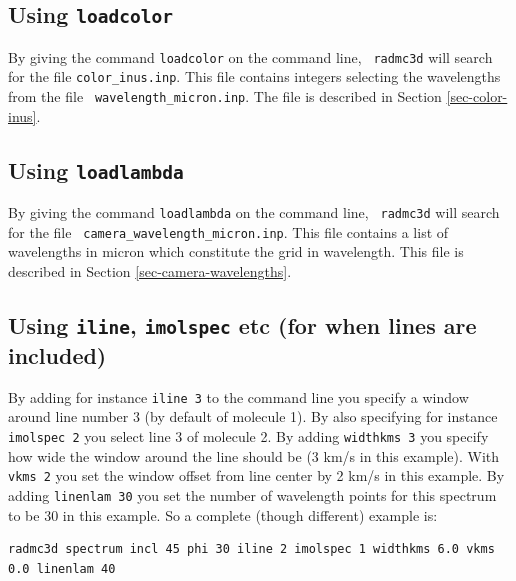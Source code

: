 \documentclass{report}
\newenvironment{asciibox}%
  {\begin{list}{}{%
    \setlength{\topsep}{0.5em}%
    \setlength{\parskip}{0em}%
    \setlength{\parsep}{0em}%
    \setlength{\itemsep}{0em}%
    \setlength{\rightmargin}{0em}%
    \setlength{\leftmargin}{3.0em}%
    \setlength{\labelsep}{1em}%
    \setlength{\labelwidth}{2em}%
  }\normalfont\footnotesize\item}
  {\end{list}}
\begin{document}
\subsection{Using {\small\tt loadcolor}}
By giving the command {\small\tt loadcolor} on the command line, {\small\tt
  radmc3d} will search for the file {\small\tt color\_inus.inp}. This file
contains integers selecting the wavelengths from the file {\small\tt
  wavelength\_micron.inp}. The file is described in Section
\ref{sec-color-inus}.

\subsection{Using {\small\tt loadlambda}}
By giving the command {\small\tt loadlambda} on the command line, {\small\tt
  radmc3d} will search for the file {\small\tt
  camera\_wavelength\_micron.inp}. This file contains a list of wavelengths
in micron which constitute the grid in wavelength. This file is described in
Section \ref{sec-camera-wavelengths}.

\subsection{Using {\small\tt iline}, {\small\tt imolspec} etc (for when
  lines are included)}
By adding for instance {\small\tt iline 3} to the command line you specify a
window around line number 3 (by default of molecule 1). By also specifying
for instance {\small\tt imolspec 2} you select line 3 of molecule 2. By
adding {\small\tt widthkms 3} you specify how wide the window around the
line should be (3 km/s in this example). With {\small\tt vkms 2} you set the
window offset from line center by 2 km/s in this example. By adding
{\small\tt linenlam 30} you set the number of wavelength points for this
spectrum to be 30 in this example. So a complete (though different) example
is:
\begin{asciibox}\begin{verbatim}
radmc3d spectrum incl 45 phi 30 iline 2 imolspec 1 widthkms 6.0 vkms 0.0 linenlam 40
\end{verbatim}\end{asciibox}
\end{document}
